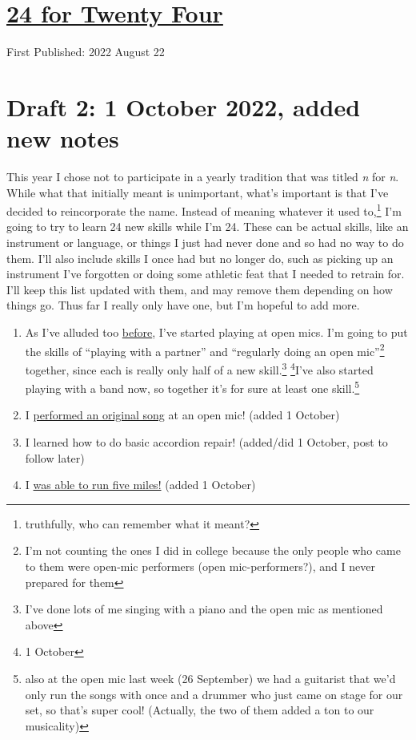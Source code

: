 \documentclass[12pt]{article}[titlepage]
\newcommand{\say}[1]{``#1''}
\newcommand{\1}{\={a}}
\newcommand{\2}{\={e}}
\newcommand{\3}{\={\i}}
\newcommand{\4}{\=o}
\newcommand{\5}{\=u}
\newcommand{\6}{\={A}}
\renewcommand{\,}{\textsuperscript{,}}
\begin{document}
\doublespacing
\section{\href{twenty-four-html}{24 for Twenty Four}}
First Published: 2022 August 22
\section{Draft 2: 1 October 2022, added new notes}
This year I chose not to participate in a yearly tradition that was titled \textit{n} for \textit{n}.
While what that initially meant is unimportant, what's important is that I've decided to reincorporate the name.
Instead of meaning whatever it used to,\footnote{truthfully, who can remember what it meant?} I'm going to try to learn 24 new skills while I'm 24.
These can be actual skills, like an instrument or language, or things I just had never done and so had no way to do them.
I'll also include skills I once had but no longer do, such as picking up an instrument I've forgotten or doing some athletic feat that I needed to retrain for.
I'll keep this list updated with them, and may remove them depending on how things go.
Thus far I really only have one, but I'm hopeful to add more.

\begin{enumerate}
\item As I've alluded too \href{open-mic-2.html}{before}, I've started playing at open mics.
I'm going to put the skills of \say{playing with a partner} and \say{regularly doing an open mic}\footnote{I'm not counting the ones I did in college because the only people who came to them were open-mic performers (open mic-performers?), and I never prepared for them} together, since each is really only half of a new skill.\footnote{I've done lots of me singing with a piano and the open mic as mentioned above} \footnote{1 October}I've also started playing with a band now, so together it's for sure at least one skill.\footnote{also at the open mic last week (26 September) we had a guitarist that we'd only run the songs with once and a drummer who just came on stage for our set, so that's super cool! (Actually, the two of them added a ton to our musicality)}
\item I \href{performing-a-song.html}{performed an original song} at an open mic! (added 1 October)
\item I learned how to do basic accordion repair! (added/did 1 October, post to follow later)
\item I \href{running-2.html}{was able to run five miles!} (added 1 October)
\end{enumerate}
\end{document}
